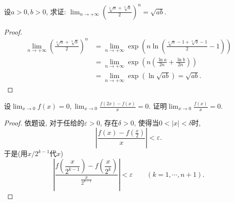 \begin{quiza}
\begin{solution}
\end{solution}
\woe 设\(a>0,b>0\), 求证: \(\lim_{n\rightarrow+\infty}\left(\frac{\sqrt[n]{a}+\sqrt[n]{b}}{2}\right)^n=\sqrt{ab}\).
\begin{proof}
\[\begin{split}
\lim_{n\rightarrow+\infty}\left(\frac{\sqrt[n]{a}+\sqrt[n]{b}}{2}\right)^n&=\lim_{n\rightarrow+\infty}\exp\left(n\ln\left(\frac{\sqrt[n]{a}-1+\sqrt[n]{b}-1}{2}-1\right)\right)\\&=\lim_{n\rightarrow+\infty}\exp\left(n\left(\frac{\ln a}{2n}+\frac{\ln b}{2n}\right)\right)\\&=\lim_{n\rightarrow+\infty}\exp\left(\ln\sqrt{ab}\right)=\sqrt{ab}.
\end{split}\]
\end{proof}
\woe 设\(\lim_{x\rightarrow 0}f(x)=0,\lim_{x\rightarrow 0}\frac{f(2x)-f(x)}{x}=0\). 证明\(\lim_{x\rightarrow 0}\frac{f(x)}{x}=0.\)
\begin{proof}
依题设, 对于任给的\(\varepsilon>0\), 存在\(\delta>0\), 使得当\(0<|x|<\delta\)时,\[\left|\frac{f(x)-f(\frac{x}{2})}{x}\right|<\varepsilon.\]于是(用\(x/2^{k-1}\)代\(x\))\[\left|\frac{f\left(\dfrac{x}{2^{k-1}}\right)-f\left(\dfrac{x}{2^k}\right)}{\frac{x}{2^{k-1}}}\right|<\varepsilon\qquad (k=1,\cdots,n+1).\]


\end{proof}
\end{quiza}
